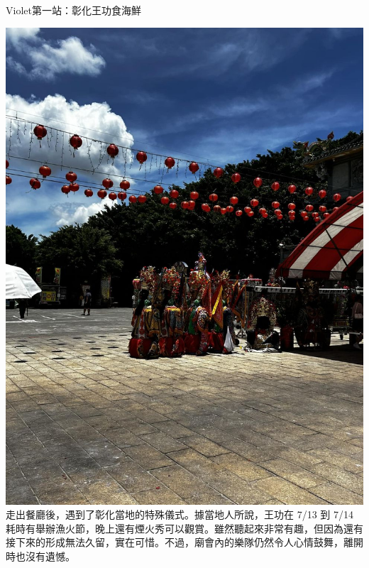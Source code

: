\documentclass{article}
\begin{document}
\begin{large}
\begin{boxpar}{Violet}{第一站：彰化王功食海鮮}
\begin{tcolorbox}[sidebyside, lefthand width=0.25\textwidth, colback=Violet!50!white, colframe=Violet]
    \includegraphics[width=\linewidth]{gods.jpg}
  \tcblower
  走出餐廳後，遇到了彰化當地的特殊儀式。據當地人所說，王功在 7/13 到 7/14
    耗時有舉辦漁火節，晚上還有煙火秀可以觀賞。雖然聽起來非常有趣，但因為還有接下來的形成無法久留，實在可惜。不過，廟會內的樂隊仍然令人心情鼓舞，離開時也沒有遺憾。
  \end{tcolorbox}
\end{boxpar}


\end{large}
\end{document}

